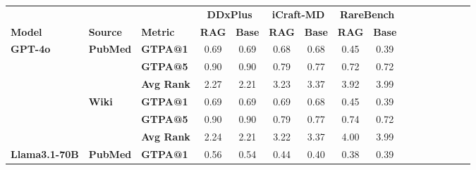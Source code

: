 \setlength{\tabcolsep}{0.2pt}
\begin{table}[t]
    \centering
    \scriptsize{%
    \begin{tabular}{lllccccccccccccc}
    \toprule
     & &  & \multicolumn{2}{c}{\textbf{DDxPlus}} & \multicolumn{2}{c}{\textbf{iCraft-MD}} & \multicolumn{2}{c}{\textbf{RareBench}} \\
    \cmidrule(lr){4-5} \cmidrule(lr){6-7} \cmidrule(lr){8-9}
     \textbf{Model}& \textbf{Source}& \textbf{Metric} & \textbf{RAG} & \textbf{Base} & \textbf{RAG} & \textbf{Base} & \textbf{RAG} & \textbf{Base} \\
    \midrule
    \multirow{4}{*}{\textbf{GPT-4o}} 
    & \multirow{2}{*}{\textbf{PubMed}} 
    & \textbf{GTPA@1} & 0.69 & 0.69 & 0.68 & 0.68 & 0.45 & 0.39 \\
    & & \textbf{GTPA@5} & 0.90 & 0.90 & 0.79 & 0.77 & 0.72 & 0.72 \\
    & & \textbf{Avg Rank} & 2.27 & 2.21 & 3.23 & 3.37 & 3.92 & 3.99 \\
    \cmidrule{2-9}
    & \multirow{2}{*}{\textbf{Wiki}} 
    & \textbf{GTPA@1} & 0.69 & 0.69 & 0.69 & 0.68 & 0.45 & 0.39 \\
    & & \textbf{GTPA@5} & 0.90 & 0.90 & 0.79 & 0.77 & 0.74 & 0.72 \\
    & & \textbf{Avg Rank} & 2.24 & 2.21 & 3.22 & 3.37 & 4.00 & 3.99 \\
    \midrule
    \multirow{4}{*}{\textbf{Llama3.1-70B}} 
    & \multirow{2}{*}{\textbf{PubMed}} 
    & \textbf{GTPA@1} & 0.56 & 0.54 & 0.44 & 0.40 & 0.38 & 0.39 \\

\end{tabular}}
\end{table}
